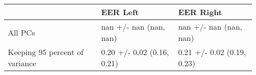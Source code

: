 \begin{tabular}{lll}
\toprule
{} &                    EER Left &                   EER Right \\
\midrule
All PCs                        &      nan +/- nan (nan, nan) &      nan +/- nan (nan, nan) \\
Keeping 95 percent of variance &  0.20 +/- 0.02 (0.16, 0.21) &  0.21 +/- 0.02 (0.19, 0.23) \\
\bottomrule
\end{tabular}
